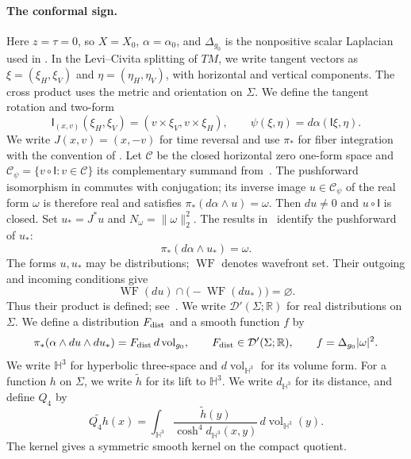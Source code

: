 \documentclass[11pt,letterpaper,reqno]{amsart}
\theoremstyle{remark}
\newcommand{\cC}{\mathcal C}
\begin{document}
\paragraph{The conformal sign.}
Here $z=\tau=0$, so $X=X_0$, $\alpha=\alpha_0$, and $\Delta_{g_0}$ is the
nonpositive scalar Laplacian used in \cite{CDDP}.
In the Levi--Civita splitting of $TM$, we write tangent vectors as
$\xi=(\xi_H,\xi_V)$ and $\eta=(\eta_H,\eta_V)$, with horizontal
and vertical components. The cross product uses the metric and
orientation on $\Sigma$. We define the tangent rotation and two-form
\[
 \mathsf I_{(x,v)}(\xi_H,\xi_V)
   =(v\times\xi_V,v\times\xi_H),\qquad
 \psi(\xi,\eta)=d\alpha(\mathsf I\xi,\eta).
\]
We write $J(x,v)=(x,-v)$ for time reversal and use $\pi_*$ for
fiber integration with
the convention of \cite{CDDP}.
Let $\cC$ be the closed horizontal zero one-form space and
$\cC_\psi=\{v\circ\mathsf I:v\in\cC\}$ its complementary summand
from~\cite[Lemma~3.9]{CDDP}. The pushforward isomorphism in
\cite[Lemma~3.17]{CDDP} commutes with conjugation; its inverse image
$u\in\cC_\psi$ of the real form $\omega$ is therefore real and satisfies
$\pi_*(d\alpha\wedge u)=\omega$.
Then $du\ne0$ and $u\circ\mathsf I$ is closed.
Set $u_*=J^*u$ and $N_\omega=\|\omega\|_2^2$.
The results in~\cite[Lemma~3.17 and Corollary~5.1]{CDDP} identify
the pushforward of $u_*$:
\[
 \pi_*(d\alpha\wedge u_*)=\omega.
\]
The forms $u,u_*$ may be distributions; $\operatorname{WF}$ denotes wavefront set.
Their outgoing and incoming conditions give
\[
 \operatorname{WF}(du)\cap\bigl(-\operatorname{WF}(du_*)\bigr)=\varnothing.
\]
Thus their product is defined; see~\cite[Section~2.3]{CDDP}.
We write $\mathcal D'(\Sigma;\mathbb R)$ for real distributions on
$\Sigma$. We define a distribution $F_{\rm dist}$ and a smooth function $f$ by
\[
 \pi_*(\alpha\wedge du\wedge du_*)
       =F_{\rm dist}\,d\operatorname{vol}_{g_0},\qquad
 F_{\rm dist}\in\mathcal D'(\Sigma;\mathbb R),\qquad
 f=\Delta_{g_0}|\omega|^2.
\]
We write $\mathbb H^3$ for hyperbolic three-space and
$d\operatorname{vol}_{\mathbb H^3}$ for its volume form. For a function $h$
on $\Sigma$, we write $\widetilde h$ for its lift to $\mathbb H^3$.
We write $d_{\mathbb H^3}$ for its distance,
and define $Q_4$ by
\begin{equation}\label{app:Q4definition}
 \widetilde{Q_4h}(x)=\int_{\mathbb H^3}
 \frac{\widetilde h(y)}{\cosh^4 d_{\mathbb H^3}(x,y)}
       \,d\operatorname{vol}_{\mathbb H^3}(y).
\end{equation}
The kernel gives a symmetric smooth kernel on the compact quotient.
\end{document}
